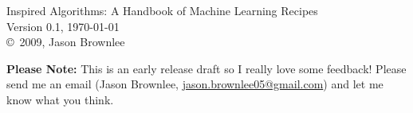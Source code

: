 
\blanknonumber


\begin{flushleft}
%
Inspired Algorithms: A Handbook of Machine Learning Recipes \\
Version 0.1, \today \\
\copyright\ 2009, Jason Brownlee \\
%
\end{flushleft}

\hfill

{\textbf{\color{red}Please Note:} This is an early release draft so I really love some feedback! Please send me an email (Jason Brownlee, \url{jason.brownlee05@gmail.com}) and let me know what you think.}

	
\vfill\vfill\vfill